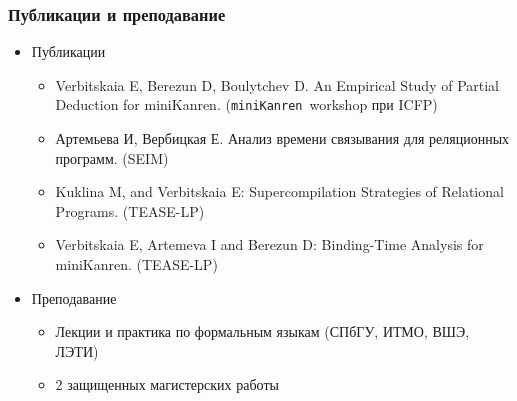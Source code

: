 \documentclass{beamer}
\newcommand{\miniKanren}{\texttt{miniKanren}}
\begin{document}
\begin{frame}[fragile]
  \frametitle{Публикации и преподавание}
  \begin{itemize}
    \item Публикации
    \begin{itemize}
      \item Verbitskaia E, Berezun D, Boulytchev D. An Empirical Study of Partial Deduction for miniKanren. (\miniKanren \ workshop при ICFP)
      \item Артемьева И, Вербицкая Е. Анализ времени связывания для реляционных программ. (SEIM)
      \item Kuklina M, and Verbitskaia E: Supercompilation Strategies of Relational Programs. (TEASE-LP)
      \item Verbitskaia E, Artemeva I and Berezun D: Binding-Time Analysis for miniKanren. (TEASE-LP)
    \end{itemize}
    \item Преподавание
    \begin{itemize}
      \item Лекции и практика по формальным языкам (СПбГУ, ИТМО, ВШЭ, ЛЭТИ)
      \item 2 защищенных магистерских работы
    \end{itemize}
  \end{itemize}


\end{frame}
\end{document}

